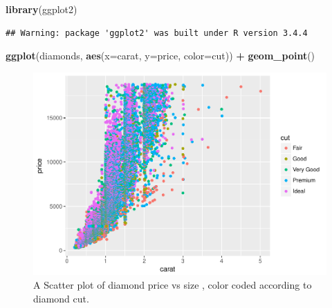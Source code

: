 \documentclass[]{article}
\newenvironment{Shaded}{\begin{snugshade}}{\end{snugshade}}
\newcommand{\KeywordTok}[1]{\textcolor[rgb]{0.13,0.29,0.53}{\textbf{#1}}}
\newcommand{\DataTypeTok}[1]{\textcolor[rgb]{0.13,0.29,0.53}{#1}}
\newcommand{\StringTok}[1]{\textcolor[rgb]{0.31,0.60,0.02}{#1}}
\newcommand{\OperatorTok}[1]{\textcolor[rgb]{0.81,0.36,0.00}{\textbf{#1}}}
\newcommand{\NormalTok}[1]{#1}
\begin{document}
\begin{Shaded}
\begin{Highlighting}[]
\KeywordTok{library}\NormalTok{(ggplot2)}
\end{Highlighting}
\end{Shaded}

\begin{verbatim}
## Warning: package 'ggplot2' was built under R version 3.4.4
\end{verbatim}

\begin{Shaded}
\begin{Highlighting}[]
\KeywordTok{ggplot}\NormalTok{(diamonds, }\KeywordTok{aes}\NormalTok{(}\DataTypeTok{x=}\NormalTok{carat, }\DataTypeTok{y=}\NormalTok{price, }\DataTypeTok{color=}\NormalTok{cut)) }\OperatorTok{+}
\StringTok{    }\KeywordTok{geom_point}\NormalTok{()}
\end{Highlighting}
\end{Shaded}

\begin{figure}

{\centering \includegraphics{MarkDown_files/figure-latex/plot-diamonds-1} 

}

\caption{A Scatter plot of diamond price vs size , color coded according to diamond cut.}\label{fig:plot-diamonds}
\end{figure}
\end{document}
